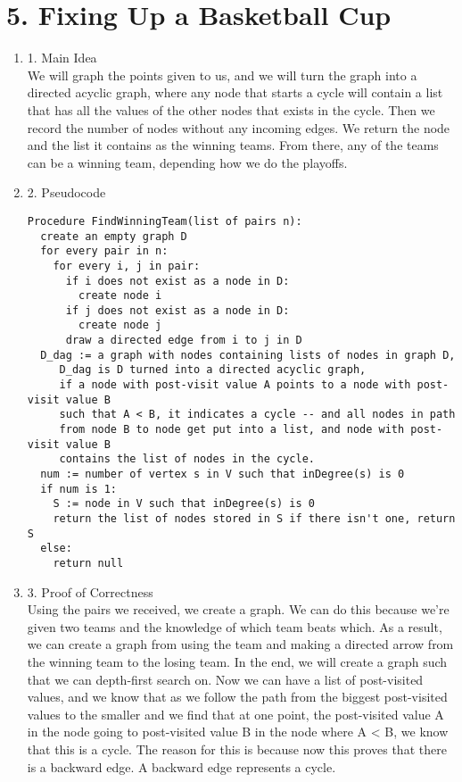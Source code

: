 \documentclass[11pt]{article}
\newenvironment{qparts}{\begin{enumerate}[{(}a{)}]}{\end{enumerate}}
\begin{document}
\section*{5. Fixing Up a Basketball Cup}
\begin{qparts}
\item[1.] Main Idea \\
We will graph the points given to us, and we will turn the graph into a directed acyclic graph, where any node that starts a cycle will contain a list that has all the values of the other nodes that exists in the cycle. Then we record the number of nodes without any incoming edges. We return the node and the list it contains as the winning teams. From there, any of the teams can be a winning team, depending how we do the playoffs. 
\item[2.] Pseudocode
\begin{verbatim}
Procedure FindWinningTeam(list of pairs n):
  create an empty graph D
  for every pair in n:
    for every i, j in pair:
      if i does not exist as a node in D:
        create node i
      if j does not exist as a node in D:
        create node j
      draw a directed edge from i to j in D
  D_dag := a graph with nodes containing lists of nodes in graph D,
     D_dag is D turned into a directed acyclic graph,
     if a node with post-visit value A points to a node with post-visit value B
     such that A < B, it indicates a cycle -- and all nodes in path 
     from node B to node get put into a list, and node with post-visit value B
     contains the list of nodes in the cycle.
  num := number of vertex s in V such that inDegree(s) is 0
  if num is 1:
    S := node in V such that inDegree(s) is 0
    return the list of nodes stored in S if there isn't one, return S
  else:
    return null
\end{verbatim}
\item[3.] Proof of Correctness \\
Using the pairs we received, we create a graph. We can do this because we're given two teams and the knowledge of which team beats which. As a result, we can create a graph from using the team and making a directed arrow from the winning team to the losing team. In the end, we will create a graph such that we can depth-first search on. Now we can have a list of post-visited values, and we know that as we follow the path from the biggest post-visited values to the smaller and we find that at one point, the post-visited value A in the node going to post-visited value B in the node where A < B, we know that this is a cycle. The reason for this is because now this proves that there is a backward edge. A backward edge represents a cycle. \\


\end{qparts}
\end{document}
